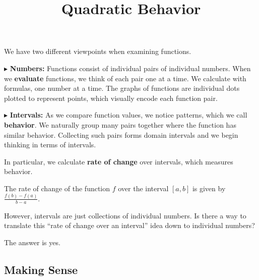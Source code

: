 \documentclass{ximera}
\title{Quadratic  Behavior}
\begin{document}
\begin{abstract}
\end{abstract}
\maketitle


 
 




We have two different viewpoints when examining functions.


$\blacktriangleright$ \textbf{Numbers:}  Functions consist of individual pairs of individual numbers.  When we \textbf{\textcolor{purple!85!blue}{evaluate}} functions, we think of each pair one at a time.  We calculate with formulas, one number at a time. The graphs of functions are individual dots plotted to represent points, which visually encode each function pair. 







$\blacktriangleright$ \textbf{Intervals:} As we compare function values, we notice patterns, which we call \textbf{\textcolor{purple!85!blue}{behavior}}. We naturally group many pairs together where the function has similar behavior.  Collecting such pairs forms domain intervals and we begin thinking in terms of intervals.





In particular, we calculate \textbf{\textcolor{blue!55!black}{rate of change}} over intervals, which measures behavior. 



The rate of change of the function $f$ over the interval $[a, b]$ is given by $\frac{f(b) - f(a)}{b - a}$.




However, intervals are just collections of individual numbers.  Is there a way to translate this ``rate of change over an interval'' idea down to individual numbers?

The answer is yes.  









\subsection*{Making Sense}
\end{document}

